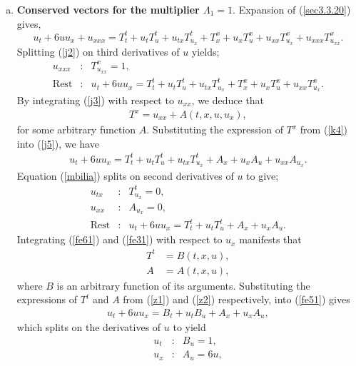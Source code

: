 \begin{enumerate}[(a)]
\item \textbf{Conserved vectors for the multiplier  $\Lambda_1= 1.$}
	Expansion of  (\ref{sec3.3.20})  gives,
	\begin{equation}   u_t + 6uu_x + u_{xxx} = T_t^t + u_t T^t_u + u_{tx} T^t_{u_x} + T^x_x+ u_x T^x_u + u_{xx} T^x_{u_x}  + u_{xxx} T^x_{u_{xx}}.  
	\label{j2}
	\end{equation}
	Splitting  (\ref{j2})  on third derivatives of $u$ yields;
	\begin{eqnarray}
	\label{j3} u_{xxx} &:&T^x_{u_{xx}}=1, \\
	\label{j5} \text{Rest} &:& u_{t}+6 u u_{x}= T^t_t+ u_tT^t_u+u_{tx}T^t_{u_x}+T^x_x+u_xT^x_u  +u_{xx}T^x_{u_x}.
	\end{eqnarray}	
	By integrating (\ref{j3})  with respect to $u_{xx}$, we deduce that
	\begin{align}
	T^x=u_{xx}+A(t,x,u,u_x), \label{k4}
	\end{align}  for some arbitrary function  $A$. Substituting the expression of $T^x$ from  (\ref{k4}) into  (\ref{j5}), we have \begin{align}
	u_{t}+6 u u_{x}= T^t_t+u_{t} T^t_u +u_{tx}T^t_{u_x}+A_x+u_xA_u  +u_{xx}A_{u_x}. \label{mbilia}
	\end{align}
Equation (\ref{mbilia})	 splits on second derivatives of $u$ to give;
	\begin{eqnarray}
	\label{fe61} u_{tx} &:&T^t_{u_{x}}=0, \\
	\label{fe31} u_{xx} &:&A_{u_{x}}=0, \\
	\label{fe51} \text{Rest} &:&u_t+ 6 uu_x=T^t_t+u_tT^t_u +A_x +u_{x}A_u .
	\end{eqnarray}
Integrating  (\ref{fe61}) and (\ref{fe31}) with respect to $u_x$	manifests that \begin{align} \label{z1}T^t&=B(t,x,u),\\
\label{z2} A& =A(t,x,u),
\end{align} where $B$ is an arbitrary function of its arguments. Substituting the expressions of $T^t$ and $A$ from (\ref{z1})  and (\ref{z2}) respectively, into  (\ref{fe51}) gives \begin{align}\label{jkay1}
	u_t+ 6 uu_x=B_t+u_tB_u +A_x +u_{x}A_u ,
	\end{align}
	which splits on  the derivatives of $u$ to yield
	\begin{eqnarray}
	\label{fe71} u_{t} &:&B_u=1 , \\
	\label{f771} u_{x} &:&A_u= 6 u, \\

\end{eqnarray}
\end{enumerate}
